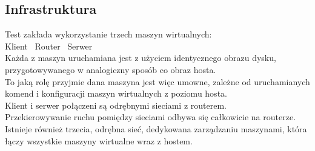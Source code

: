 \subsection{Infrastruktura}

Test zakłada wykorzystanie trzech maszyn wirtualnych:\\

Klient \rightleftarrows \ Router \rightleftarrows \ Serwer\\

Każda z maszyn uruchamiana jest z użyciem identycznego obrazu dysku, przygotowywanego w analogiczny sposób co obraz hosta.\\

To jaką rolę przyjmie dana maszyna jest więc umowne, zależne od uruchamianych komend i konfiguracji maszyn wirtualnych z poziomu hosta.\\

Klient i serwer połączeni są odrębnymi sieciami z routerem.\\
Przekierowywanie ruchu pomiędzy sieciami odbywa się całkowicie na routerze.\\

Istnieje również trzecia, odrębna sieć, dedykowana zarządzaniu maszynami, która łączy wszystkie maszyny wirtualne wraz z hostem.